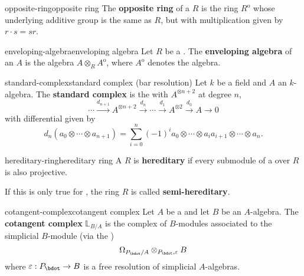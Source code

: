 \begin{topic}{opposite-ring}{opposite ring}
    The \textbf{opposite ring} of a  $R$ is the ring $R^\text{o}$ whose underlying additive group is the same as $R$, but with multiplication given by $r \cdot s = sr$.
\end{topic}

\begin{topic}{enveloping-algebra}{enveloping algebra}
    Let $R$ be a . The \textbf{enveloping algebra} of an  $A$ is the algebra $A \otimes_R A^\text{o}$, where $A^\text{o}$ denotes the  algebra.
\end{topic}

\begin{topic}{standard-complex}{standard complex (bar resolution)}
    Let $k$ be a field and $A$ an $k$-algebra. The \textbf{standard complex} is the  with $A^{\otimes n + 2}$ at degree $n$,
    \[ \cdots \xrightarrow{d_{n + 1}} A^{\otimes n + 2} \xrightarrow{d_n} \cdots \xrightarrow{d_1} A^{\otimes 2} \xrightarrow{d_0} A \to 0 \]
    with differential given by
    \[ d_n(a_0 \otimes \cdots \otimes a_{n + 1}) = \sum_{i = 0}^{n} (-1)^i a_0 \otimes \cdots \otimes a_i a_{i + 1} \otimes \cdots \otimes a_n . \]
\end{topic}

\begin{topic}{hereditary-ring}{hereditary ring}
    A  $R$ is \textbf{hereditary} if every submodule of a  over $R$ is also projective.
    
    If this is only true for , the ring $R$ is called \textbf{semi-hereditary}.
\end{topic}

\begin{topic}{cotangent-complex}{cotangent complex}
    Let $A$ be a  and let $B$ be an $A$-algebra. The \textbf{cotangent complex} $\mathbb{L}_{B/A}$ is the complex of $B$-modules associated to the simplicial $B$-module (via the )
    \[ \Omega_{P_\bdot/A} \otimes_{P_\bdot, \varepsilon} B \]
    where $\varepsilon : P_\bdot \to B$ is a free resolution of simplicial $A$-algebras.
\end{topic}


